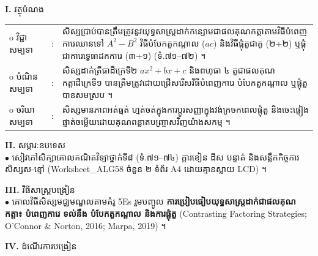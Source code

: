 \documentclass[a4paper,10pt]{article}
\newcommand{\wcirc}{{\CourierBullet\fontsize{9.5pt}{11pt}\selectfont o}}
\newcommand{\en}[1]{{\TimesEn #1}}
\begin{document}
\textbf{I.} {\muol វត្ថុបំណង}\\[1pt]
\hspace*{0.55cm}%
\begin{tabular}{@{}l l L{14.2cm}@{}}
  \wcirc \hspace{0.25cm} វិជ្ជាសម្បទា & : & សិស្សប្រាប់បានត្រឹមត្រូវនូវយុទ្ធសាស្ត្រដាក់កន្សោមជាផលគុណកត្តាតាមវិធីបំពេញការេឈានទៅ $A^2-B^2$ វិធីបំបែកតួកណ្ដាល ($ac$) និងវិធីផ្ដុំតួជាគូ (២+២) ឬផ្ដុំជាការេទ្វេធាដកការេ (៣+១) (ទំ.៧១--៧២) ។ \\
  \wcirc \hspace{0.25cm} បំណិនសម្បទា & : & សិស្សដាក់ត្រីធាដឺក្រេទី២ $ax^2+bx+c$ និងពហុធា ៤ តួជាផលគុណកត្តាដឺក្រេទី១ បានត្រឹមត្រូវដោយជ្រើសរើសវិធីបំពេញការេ បំបែកតួកណ្ដាល ឬផ្ដុំតួបានសមស្រប ។ \\
  \wcirc \hspace{0.25cm} ចរិយាសម្បទា & : & សិស្សមានភាពអត់ធ្មត់ ហ្មត់ចត់ក្នុងការប្ដូរសញ្ញាក្នុងវង់ក្រចកពេលផ្ដុំតួ និងចេះផ្ទៀងផ្ទាត់ចម្លើយដោយគុណពន្លាតបញ្ច្រាសវិញយ៉ាងសកម្ម ។ \\
\end{tabular}

\vspace{1pt}

\textbf{II.} {\muol សម្ភារៈឧបទេស}\\[1pt]
\hspace*{0.55cm}$\bullet$ \hspace{0.35cm} សៀវភៅសិក្សាគោលគណិតវិទ្យាថ្នាក់ទី៨ (ទំ.៧១--៧៤) ក្ដារខៀន ដីស បន្ទាត់ និងសន្លឹកកិច្ចការសិស្សស-ខ្មៅ (\en{Worksheet\_ALG58} ចំនួន ២ ទំព័រ \en{A4} ដោយគ្មានស្លាយ \en{LCD}) ។

\vspace{1pt}

\textbf{III.} {\muol វិធីសាស្រ្តបង្រៀន}\\[1pt]
\hspace*{0.55cm}$\bullet$ \hspace{0.35cm} គោលវិធីសិស្សមជ្ឈមណ្ឌលតាមគំរូ \en{5Es} រួមបញ្ចូល \textbf{ការប្រៀបធៀបយុទ្ធសាស្ត្រដាក់ជាផលគុណកត្តា៖ បំពេញការេ ទល់នឹង បំបែកតួកណ្ដាល និងការផ្ដុំតួ} (\en{Contrasting Factoring Strategies}; \en{O'Connor \& Norton, 2016; Marpa, 2019}) ។

\vspace{2pt}

\textbf{IV.} {\muol ដំណើរការបង្រៀន}\\[-6pt]
\end{document}

